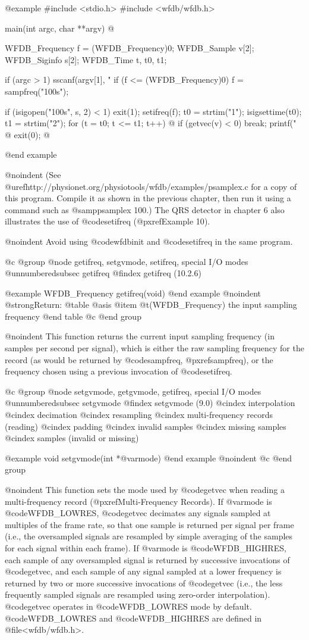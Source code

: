 {{{{{{{{@example
#include <stdio.h>
#include <wfdb/wfdb.h>

main(int argc, char **argv)
@{
    WFDB_Frequency f = (WFDB_Frequency)0;
    WFDB_Sample v[2];
    WFDB_Siginfo s[2];
    WFDB_Time t, t0, t1;

    if (argc > 1) sscanf(argv[1], "%
    if (f <= (WFDB_Frequency)0) f = sampfreq("100s");

    if (isigopen("100s", s, 2) < 1)
        exit(1);
    setifreq(f);
    t0 = strtim("1");
    isigsettime(t0);
    t1 = strtim("2");
    for (t = t0; t <= t1; t++) @{
        if (getvec(v) < 0)
            break;
        printf("%
    @}
    exit(0);
@}
@end example

@noindent
(See @uref{http://physionet.org/physiotools/wfdb/examples/psamplex.c} for a
copy of this program.  Compile it as shown in the previous chapter, then run it
using a command such as @samp{psamplex 100}.)  The QRS detector in chapter 6
also illustrates the use of @code{setifreq} (@pxref{Example 10}).

@noindent
Avoid using @code{wfdbinit} and @code{setifreq} in the same program.

@c @group
@node     getifreq, setgvmode, setifreq, special I/O modes
@unnumberedsubsec getifreq
@findex getifreq (10.2.6)

@example
WFDB_Frequency getifreq(void)
@end example
@noindent
@strong{Return:}
@table @asis
@item @t{(WFDB_Frequency)}
the input sampling frequency
@end table
@c @end group

@noindent
This function returns the current input sampling frequency (in samples
per second per signal), which is either the raw sampling frequency for
the record (as would be returned by @code{sampfreq}, @pxref{sampfreq}),
or the frequency chosen using a previous invocation of @code{setifreq}.

@c @group
@node     setgvmode, getgvmode, getifreq, special I/O modes
@unnumberedsubsec setgvmode
@findex setgvmode (9.0)
@cindex interpolation
@cindex decimation
@cindex resampling
@cindex multi-frequency records (reading)
@cindex padding
@cindex invalid samples
@cindex missing samples
@cindex samples (invalid or missing)

@example
void setgvmode(int *@var{mode})
@end example
@noindent
@c @end group

@noindent
This function sets the mode used by @code{getvec} when reading a
multi-frequency record (@pxref{Multi-Frequency Records}).  If @var{mode} is
@code{WFDB_LOWRES}, @code{getvec} decimates any signals sampled at multiples of
the frame rate, so that one sample is returned per signal per frame (i.e., the
oversampled signals are resampled by simple averaging of the samples for each
signal within each frame).  If @var{mode} is @code{WFDB_HIGHRES}, each sample
of any oversampled signal is returned by successive invocations of
@code{getvec}, and each sample of any signal sampled at a lower frequency is
returned by two or more successive invocations of @code{getvec} (i.e., the less
frequently sampled signals are resampled using zero-order interpolation).
@code{getvec} operates in @code{WFDB_LOWRES} mode by default.
@code{WFDB_LOWRES} and @code{WFDB_HIGHRES} are defined in @file{<wfdb/wfdb.h>}.

}}}}}}}}
